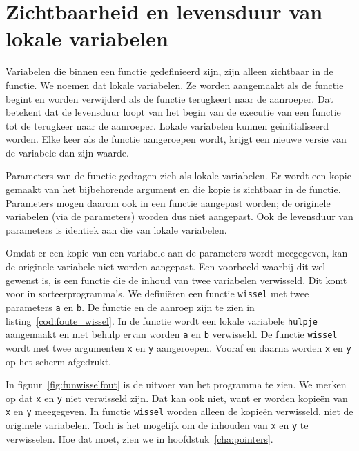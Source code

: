\section{Zichtbaarheid en levensduur van lokale variabelen}
Variabelen die binnen een functie gedefinieerd zijn, zijn alleen zichtbaar in de functie. We noemen dat lokale variabelen. Ze worden aangemaakt als de functie begint en worden verwijderd als de functie terugkeert naar de aanroeper. Dat betekent dat de levensduur loopt van het begin van de executie van een functie tot de terugkeer naar de aanroeper. Lokale variabelen kunnen geïnitialiseerd worden. Elke keer als de functie aangeroepen wordt, krijgt een nieuwe versie van de variabele dan zijn waarde.

Parameters van de functie gedragen zich als lokale variabelen. Er wordt een kopie gemaakt van het bijbehorende argument en die kopie is zichtbaar in de functie. Parameters mogen daarom ook in een functie aangepast worden; de originele variabelen (via de parameters) worden dus niet aangepast. Ook de levensduur van parameters is identiek aan die van lokale variabelen.

Omdat er een kopie van een variabele aan de parameters wordt meegegeven, kan de originele variabele niet worden aangepast. Een voorbeeld waarbij dit wel gewenst is, is een functie die de inhoud van twee variabelen verwisseld. Dit komt voor in sorteerprogramma's. We definiëren een functie \texttt{wissel} met twee parameters \texttt{a} en \texttt{b}. De functie en de aanroep zijn te zien in listing~\ref{cod:foute_wissel}. In de functie wordt een lokale variabele \texttt{hulpje} aangemaakt en met behulp ervan worden \texttt{a} en \texttt{b} verwisseld. De functie \texttt{wissel} wordt met twee argumenten \texttt{x} en \texttt{y} aangeroepen. Vooraf en daarna worden \texttt{x} en \texttt{y} op het scherm afgedrukt.


In figuur~\ref{fig:funwisselfout} is de uitvoer van het programma te zien. We merken op dat \texttt{x} en \texttt{y} niet verwisseld zijn. Dat kan ook niet, want er worden kopieën van \texttt{x} en \texttt{y} meegegeven. In functie \texttt{wissel} worden alleen de kopieën verwisseld, niet de originele variabelen.
Toch is het mogelijk om de inhouden van \texttt{x} en \texttt{y} te verwisselen. Hoe dat moet, zien we in hoofdstuk~\ref{cha:pointers}.

